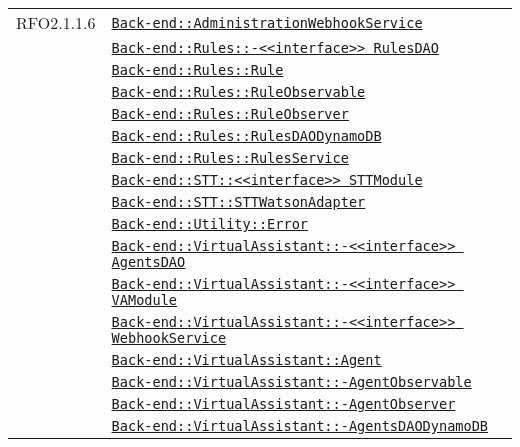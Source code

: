 \begin{longtable}{|>{\centering}m{3cm}|m{10cm}<{\centering}|}
RFO2.1.1.6 & \hyperref[Back-end::AdministrationWebhookService]{\texttt{Back-end::AdministrationWebhookService}}\\
& \hyperref[Back-end::Rules::<<interface>> RulesDAO]{\texttt{Back-end::Rules::-\linebreak <<interface>> RulesDAO}}\\
& \hyperref[Back-end::Rules::Rule]{\texttt{Back-end::Rules::Rule}}\\
& \hyperref[Back-end::Rules::RuleObservable]{\texttt{Back-end::Rules::RuleObservable}}\\
& \hyperref[Back-end::Rules::RuleObserver]{\texttt{Back-end::Rules::RuleObserver}}\\
& \hyperref[Back-end::Rules::RulesDAODynamoDB]{\texttt{Back-end::Rules::RulesDAODynamoDB}}\\
& \hyperref[Back-end::Rules::RulesService]{\texttt{Back-end::Rules::RulesService}}\\
& \hyperref[Back-end::STT::<<interface>> STTModule]{\texttt{Back-end::STT::<<interface>> STTModule}}\\
& \hyperref[Back-end::STT::STTWatsonAdapter]{\texttt{Back-end::STT::STTWatsonAdapter}}\\
& \hyperref[Back-end::Utility::Error]{\texttt{Back-end::Utility::Error}}\\
& \hyperref[Back-end::VirtualAssistant::<<interface>> AgentsDAO]{\texttt{Back-end::VirtualAssistant::-\linebreak <<interface>> AgentsDAO}}\\
& \hyperref[Back-end::VirtualAssistant::<<interface>> VAModule]{\texttt{Back-end::VirtualAssistant::-\linebreak <<interface>> VAModule}}\\
& \hyperref[Back-end::VirtualAssistant::<<interface>> WebhookService]{\texttt{Back-end::VirtualAssistant::-\linebreak <<interface>> WebhookService}}\\
& \hyperref[Back-end::VirtualAssistant::Agent]{\texttt{Back-end::VirtualAssistant::Agent}}\\
& \hyperref[Back-end::VirtualAssistant::AgentObservable]{\texttt{Back-end::VirtualAssistant::-\linebreak AgentObservable}}\\
& \hyperref[Back-end::VirtualAssistant::AgentObserver]{\texttt{Back-end::VirtualAssistant::-\linebreak AgentObserver}}\\
& \hyperref[Back-end::VirtualAssistant::AgentsDAODynamoDB]{\texttt{Back-end::VirtualAssistant::-\linebreak AgentsDAODynamoDB}}\\

\end{longtable}
